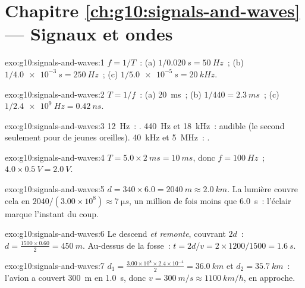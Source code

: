 \section*{Chapitre \ref{ch:g10:signals-and-waves} --- Signaux et ondes}

\begin{solution}{exo:g10:signals-and-waves:1}
$f = 1/T$~: (a) $1/\qty{0.020}{s} = \qty{50}{Hz}$~;
(b) $1/\qty{4.0e-3}{s} = \qty{250}{Hz}$~;
(c) $1/\qty{5.0e-5}{s} = \qty{20}{kHz}$.
\end{solution}

\begin{solution}{exo:g10:signals-and-waves:2}
$T = 1/f$~: (a) \qty{20}{ms}~; (b) $1/440 = \qty{2.3}{ms}$~;
(c) $1/\qty{2.4e9}{Hz} = \qty{0.42}{ns}$.
\end{solution}

\begin{solution}{exo:g10:signals-and-waves:3}
\qty{12}{Hz}~: . \qty{440}{Hz} et \qty{18}{kHz}~: audible
(le second seulement pour de jeunes oreilles). \qty{40}{kHz} et
\qty{5}{MHz}~: .
\end{solution}

\begin{solution}{exo:g10:signals-and-waves:4}
$T = 5.0 \times \qty{2}{ms} = \qty{10}{ms}$, donc $f = \qty{100}{Hz}$~;
 $4.0 \times \qty{0.5}{V} = \qty{2.0}{V}$.
\end{solution}

\begin{solution}{exo:g10:signals-and-waves:5}
$d = 340 \times 6.0 = \qty{2040}{m} \approx \qty{2.0}{km}$. La lumière
couvre cela en $2040/(3.00\times10^{8}) \approx \qty{7}{\micro s}$, un
million de fois moins que \qty{6.0}{s}~: l'éclair marque l'instant du
coup.
\end{solution}

\begin{solution}{exo:g10:signals-and-waves:6}
Le  descend \emph{et remonte}, couvrant $2d$~:
$d = \frac{1500 \times 0.60}{2} = \qty{450}{m}$. Au-dessus de la fosse~:
$t = 2d/v = 2 \times 1200/1500 = \qty{1.6}{s}$.
\end{solution}

\begin{solution}{exo:g10:signals-and-waves:7}
$d_1 = \frac{3.00\times10^{8} \times 2.4\times10^{-4}}{2} =
\qty{36.0}{km}$ et $d_2 = \qty{35.7}{km}$~: l'avion a couvert
\qty{300}{m} en \qty{1.0}{s}, donc $v = \qty{300}{m/s} \approx
\qty{1100}{km/h}$, en approche.
\end{solution}

